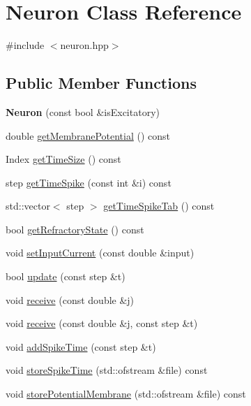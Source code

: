 \hypertarget{classNeuron}{\section{Neuron Class Reference}
\label{classNeuron}
}


{\ttfamily \#include $<$neuron.\-hpp$>$}

\subsection*{Public Member Functions}
\begin{DoxyCompactItemize}
\item 
\hypertarget{classNeuron_a2e40248fde544ffd0b2d93131d2d11f2}{{\bfseries Neuron} (const bool \&is\-Excitatory)}\label{classNeuron_a2e40248fde544ffd0b2d93131d2d11f2}

\item 
double \hyperlink{classNeuron_a86341dee7a81765fe4840777a008c688}{get\-Membrane\-Potential} () const 
\item 
Index \hyperlink{classNeuron_a383eef0a6578f876e9df360f4683afd5}{get\-Time\-Size} () const 
\item 
step \hyperlink{classNeuron_a8d9daa0300ab78408e8b4c4d1b04705b}{get\-Time\-Spike} (const int \&i) const 
\item 
std\-::vector$<$ step $>$ \hyperlink{classNeuron_a35f338de50267c40039e1c38bc927a52}{get\-Time\-Spike\-Tab} () const 
\item 
bool \hyperlink{classNeuron_a598f5a1143fa5b83c9edf952d87d05c5}{get\-Refractory\-State} () const 
\item 
void \hyperlink{classNeuron_a098ab2d61d98e2288e1f42c27717f0e0}{set\-Input\-Current} (const double \&input)
\item 
bool \hyperlink{classNeuron_ad733fecb0aae045ce60263052eb65bb0}{update} (const step \&t)
\item 
void \hyperlink{classNeuron_a7cc4e1e35efede28d44514dd02b8835b}{receive} (const double \&j)
\item 
void \hyperlink{classNeuron_adcdfedb8a0bc2fdbc4b51abb31f332ab}{receive} (const double \&j, const step \&t)
\item 
void \hyperlink{classNeuron_a9dd27e38090ecb4ea8cb964e49d98584}{add\-Spike\-Time} (const step \&t)
\item 
void \hyperlink{classNeuron_aafcb28b5258623282bc8372d4896e29f}{store\-Spike\-Time} (std\-::ofstream \&file) const 
\item 
void \hyperlink{classNeuron_ad8d822198b5b577d208ddb1cb2488e27}{store\-Potential\-Membrane} (std\-::ofstream \&file) const 
\end{DoxyCompactItemize}


